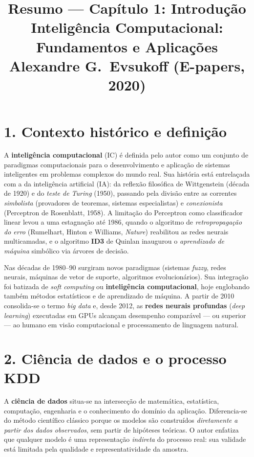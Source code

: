 \documentclass[11pt,a4paper]{article}
\title{\vspace{-1.5cm}Resumo --- Capítulo 1: Introdução\\
\large Inteligência Computacional: Fundamentos e Aplicações \\
\normalsize Alexandre G.\ Evsukoff (E-papers, 2020)}
\author{}
\date{}
\begin{document}
\maketitle
\vspace{-1.2cm}

\section*{1. Contexto histórico e definição}

A \textbf{inteligência computacional} (IC) é definida pelo autor como um conjunto de
paradigmas computacionais para o desenvolvimento e aplicação de sistemas inteligentes
em problemas complexos do mundo real. Sua história está entrelaçada com a da
inteligência artificial (IA): da reflexão filosófica de Wittgenstein (década de 1920)
e do \emph{teste de Turing} (1950), passando pela divisão entre as correntes
\emph{simbolista} (provadores de teoremas, sistemas especialistas) e
\emph{conexionista} (Perceptron de Rosenblatt, 1958). A limitação do Perceptron como
classificador linear levou a uma estagnação até 1986, quando o algoritmo de
\emph{retropropagação do erro} (Rumelhart, Hinton e Williams, \emph{Nature}) reabilitou
as redes neurais multicamadas, e o algoritmo \textbf{ID3} de Quinlan inaugurou o
\emph{aprendizado de máquina} simbólico via árvores de decisão.

Nas décadas de 1980--90 surgiram novos paradigmas (sistemas \emph{fuzzy}, redes
neurais, máquinas de vetor de suporte, algoritmos evolucionários). Sua integração foi
batizada de \emph{soft computing} ou \textbf{inteligência computacional}, hoje
englobando também métodos estatísticos e de aprendizado de máquina. A partir de 2010
consolida-se o termo \emph{big data} e, desde 2012, as \textbf{redes neurais profundas}
(\emph{deep learning}) executadas em GPUs alcançam desempenho comparável --- ou
superior --- ao humano em visão computacional e processamento de linguagem natural.

\section*{2. Ciência de dados e o processo KDD}

A \textbf{ciência de dados} situa-se na intersecção de matemática, estatística,
computação, engenharia e o conhecimento do domínio da aplicação. Diferencia-se do
método científico clássico porque os modelos são construídos \emph{diretamente a
partir dos dados observados}, sem partir de hipóteses teóricas. O autor enfatiza que
qualquer modelo é uma representação \emph{indireta} do processo real: sua validade
está limitada pela qualidade e representatividade da amostra.
\end{document}

